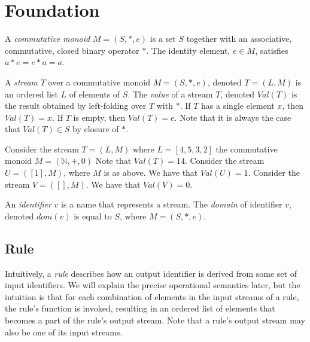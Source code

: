 \section{Foundation}
\label{sec:foundation}


A {\em commutative monoid} $M = (S, *, e)$ is a set $S$ together with an associative, commutative, closed binary operator $*$.  The identity element, $e \in M$, satisfies $a*e = e*a = a$.


A {\em stream} $T$ over a commutative monoid $M = (S, *, e)$, denoted $T = (L, M)$ is an ordered list $L$ of elements of $S$.  The {\em value} of a stream $T$, denoted $Val(T)$ is the result obtained by left-folding over $T$ with $*$.  If $T$ has a single element $x$, then $Val(T)=x$.  If $T$ is empty, then $Val(T)=e$.  Note that it is always the case that $Val(T) \in S$ by closure of $*$.

\begin{example}
Consider the stream $T = (L,M)$ where $L = [4, 5, 3, 2]$ the commutative monoid $M = (\mathbb{N}, +, 0)$ 
Note that $Val(T) = 14$.  Consider the stream $U = ([1], M)$, where $M$ is as above.  We have that $Val(U) = 1$.  Consider the stream $V = ([], M)$.  We have that $Val(V) = 0$.
\end{example}

An {\em identifier} $v$ is a name that represents a stream.  The {\em domain} of identifier $v$, denoted $dom(v)$ is equal to $S$, where $M = (S, *, e)$.

\subsection{Rule}
Intuitively, a {\em rule} describes how an output identifier is derived from some set of input identifiers.  We will explain the precise operational semantics later, but the intuition is that for each combination of elements in the input streams of a rule, the rule's function is invoked, resulting in an ordered list of elements that becomes a part of the rule's output stream.  Note that a rule's output stream may also be one of its input streams.

